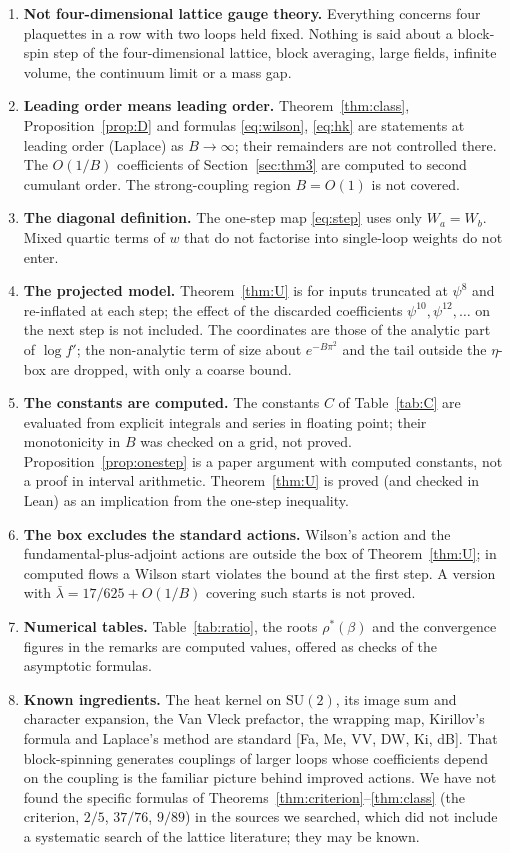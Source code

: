 \documentclass[11pt,a4paper]{article}
\theoremstyle{definition}
\theoremstyle{remark}
\newcommand{\SU}{\mathrm{SU}(2)}
\begin{document}
\begin{enumerate}[label=\arabic*.]
\item \textbf{Not four-dimensional lattice gauge theory.} Everything concerns four plaquettes in a row with two loops held fixed. Nothing is said about a block-spin step of the four-dimensional lattice, block averaging, large fields, infinite volume, the continuum limit or a mass gap.
\item \textbf{Leading order means leading order.} Theorem~\ref{thm:class}, Proposition~\ref{prop:D} and formulas \eqref{eq:wilson}, \eqref{eq:hk} are statements at leading order (Laplace) as $B\to\infty$; their remainders are not controlled there. The $O(1/B)$ coefficients of Section~\ref{sec:thm3} are computed to second cumulant order. The strong-coupling region $B=O(1)$ is not covered.
\item \textbf{The diagonal definition.} The one-step map \eqref{eq:step} uses only $W_a=W_b$. Mixed quartic terms of $w$ that do not factorise into single-loop weights do not enter.
\item \textbf{The projected model.} Theorem~\ref{thm:U} is for inputs truncated at $\psi^8$ and re-inflated at each step; the effect of the discarded coefficients $\psi^{10},\psi^{12},\dots$ on the next step is not included. The coordinates are those of the analytic part of $\log f'$; the non-analytic term of size about $e^{-B\pi^2}$ and the tail outside the $\eta$-box are dropped, with only a coarse bound.
\item \textbf{The constants are computed.} The constants $C$ of Table~\ref{tab:C} are evaluated from explicit integrals and series in floating point; their monotonicity in $B$ was checked on a grid, not proved. Proposition~\ref{prop:onestep} is a paper argument with computed constants, not a proof in interval arithmetic. Theorem~\ref{thm:U} is proved (and checked in Lean) as an implication from the one-step inequality.
\item \textbf{The box excludes the standard actions.} Wilson's action and the fundamental-plus-adjoint actions are outside the box of Theorem~\ref{thm:U}; in computed flows a Wilson start violates the bound at the first step. A version with $\bar\lambda=17/625+O(1/B)$ covering such starts is not proved.
\item \textbf{Numerical tables.} Table~\ref{tab:ratio}, the roots $\rho^*(\beta)$ and the convergence figures in the remarks are computed values, offered as checks of the asymptotic formulas.
\item \textbf{Known ingredients.} The heat kernel on $\SU$, its image sum and character expansion, the Van Vleck prefactor, the wrapping map, Kirillov's formula and Laplace's method are standard [Fa, Me, VV, DW, Ki, dB]. That block-spinning generates couplings of larger loops whose coefficients depend on the coupling is the familiar picture behind improved actions. We have not found the specific formulas of Theorems~\ref{thm:criterion}--\ref{thm:class} (the criterion, $2/5$, $37/76$, $9/89$) in the sources we searched, which did not include a systematic search of the lattice literature; they may be known.

\end{enumerate}
\end{document}
